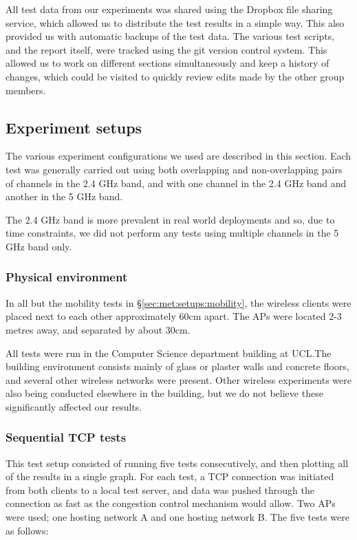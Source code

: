 All test data from our experiments was shared using the Dropbox file sharing
service, which allowed us to distribute the test results in a simple way. This also
provided us with automatic backups of the test data.
The various test scripts, and the report itself, were tracked using the git
version control system.
This allowed us to work on different sections simultaneously and keep a
history of changes, which could be visited to quickly review edits made by the
other group members.

\subsection{Experiment setups}
\label{sec:met:setups}
The various experiment configurations we used are described in this section. Each
test was generally carried out using both overlapping and non-overlapping pairs of
channels in the 2.4 GHz band, and with one channel in the 2.4 GHz band and another in the
5 GHz band.

The 2.4 GHz band is more prevalent in real world deployments and so, due to
time constraints, we did not perform any tests using
multiple channels in the 5 GHz band only.

\subsubsection{Physical environment}
In all but the mobility tests in \S\ref{sec:met:setups:mobility}, the wireless clients were placed next to each other
approximately 60cm apart. The APs were located 2-3 metres away, and separated by
about 30cm.

All tests were run in the Computer Science department building at UCL.\@ The building
environment consists mainly of glass or plaster walls and concrete floors, and
several other wireless
networks were present. Other wireless experiments were
also being conducted elsewhere in the building, but we do not believe these significantly
affected our results.

\subsubsection{Sequential TCP tests}
\label{sec:met:setups:seqtcp}
This test setup consisted of running five tests consecutively, and then
plotting all of the results in a single graph. For each test, a TCP connection was
initiated from both clients to a local test server, and data was pushed through
the connection as fast as the congestion control mechanism would allow. Two
APs were used; one hosting network A and one hosting network B. The five tests
were as follows:

